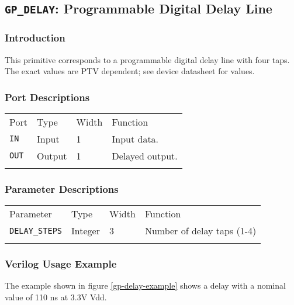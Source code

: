 \documentclass[11pt]{article}
\newcommand{\tokenstyle}[1]{\texttt{#1}}
\newcommand{\whenstyle}[1]{{\fontseries{sb}\selectfont#1}}
\newcommand{\thinhline}{\Xhline{1\arrayrulewidth}}
\newcommand{\thickhline}{\Xhline{2.5\arrayrulewidth}}
\begin{document}

\pagebreak
\subsection{\tokenstyle{GP\_DELAY}: Programmable Digital Delay Line}
\label{gp-delay}

\subsubsection{Introduction}
This primitive corresponds to a programmable digital delay line with four taps. The exact values are PTV dependent; see 
device datasheet for values.

\subsubsection{Port Descriptions}

\begin{tabularx}{\textwidth}{lllX}
\thinhline
\whenstyle{Port} & \whenstyle{Type} & \whenstyle{Width} & \whenstyle{Function} \\
\thickhline
\tokenstyle{IN} & Input & 1 & Input data. \\
\thinhline
\tokenstyle{OUT} & Output & 1 & Delayed output. \\
\thinhline
\end{tabularx}

\subsubsection{Parameter Descriptions}

\begin{tabularx}{\textwidth}{lllX}
\thinhline
\whenstyle{Parameter} & \whenstyle{Type} & \whenstyle{Width} & \whenstyle{Function} \\
\thickhline
\tokenstyle{DELAY\_STEPS} & Integer & 3 & Number of delay taps (1-4) \\
\thinhline
\end{tabularx}

\subsubsection{Verilog Usage Example}

The example shown in figure \ref{gp-delay-example} shows a delay with a nominal value of 110 ns at 3.3V Vdd.
\end{document}
